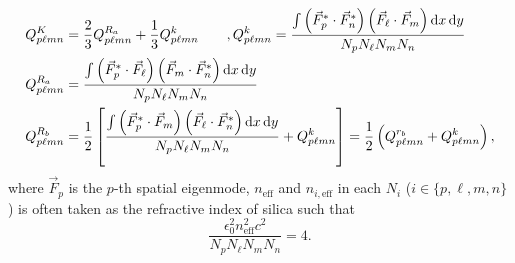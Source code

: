 \documentclass[12pt,hidelinks]{book}
\begin{document}
\begin{subequations}
\begin{align}
Q^K_{p\ell mn} & =\frac{2}{3}Q^{R_a}_{p\ell mn}+\frac{1}{3}Q^k_{p\ell mn}\qquad,Q^k_{p\ell mn}=\frac{\int\left(\vec{F}_p^{\ast}\cdot\vec{F}_n^{\ast}\right)\left(\vec{F}_{\ell}\cdot\vec{F}_m\right)\mathop{}\!\mathrm{d} x\mathop{}\!\mathrm{d} y}{N_pN_{\ell}N_mN_n} \label{eq:QK} \\
Q^{R_a}_{p\ell mn} & =\frac{\int\left(\vec{F}_p^{\ast}\cdot\vec{F}_{\ell}\right)\left(\vec{F}_m\cdot\vec{F}_n^{\ast}\right)\mathop{}\!\mathrm{d} x\mathop{}\!\mathrm{d} y}{N_pN_{\ell}N_mN_n} \label{eq:QRa} \\
Q^{R_b}_{p\ell mn} & =\frac{1}{2}\left[\frac{\int\left(\vec{F}_p^{\ast}\cdot\vec{F}_m\right)\left(\vec{F}_{\ell}\cdot\vec{F}_n^{\ast}\right)\mathop{}\!\mathrm{d} x\mathop{}\!\mathrm{d} y}{N_pN_{\ell}N_mN_n}+Q^k_{p\ell mn}\right]=\frac{1}{2}\left(Q^{r_b}_{p\ell mn}+Q^k_{p\ell mn}\right), \label{eq:QRb}
\end{align}
\label{eq:Q}
\end{subequations}
where $\vec{F}_p$ is the $p$-th spatial eigenmode, $n_{\text{eff}}$ and $n_{i,\text{eff}}$ in each $N_i$ ($i\in\{p,\ell,m,n\}$) is often taken as the refractive index of silica such that 
\begin{equation}
\frac{\epsilon_0^2n_{\text{eff}}^2c^2}{N_pN_{\ell}N_mN_n}=4.
\label{eq:Q_NNNN_relation}
\end{equation}
\end{document}
